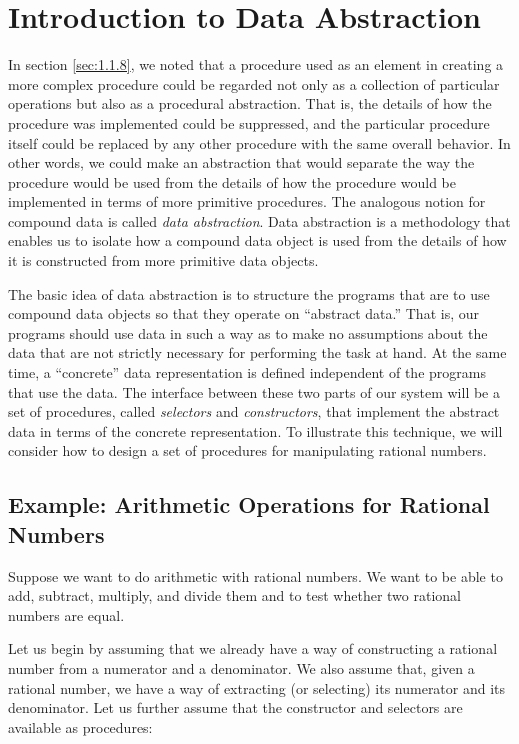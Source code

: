 

\section{Introduction to Data Abstraction}
\label{sec:2.1}

In section \ref{sec:1.1.8}, we noted
that a procedure used as an element in creating a more complex
procedure could be regarded not only as a collection of particular
operations but also as a procedural abstraction.  That is, the details
of how the procedure was implemented could be suppressed, and the
particular procedure itself could be replaced by any other procedure
with the same overall behavior.  In other words, we could make an
abstraction that would separate the way the procedure would be used
from the details of how the procedure would be implemented in terms of
more primitive procedures.  The analogous notion for compound data is
called \textit{data abstraction}.  Data abstraction is a methodology that
enables us to isolate how a compound data object is used from the
details of how it is constructed from more primitive data objects.

The basic idea of data abstraction is to structure the programs that
are to use compound data objects so that they operate on ``abstract
data.'' That is, our programs should use data in such a way as to make
no assumptions about the data that are not strictly necessary for
performing the task at hand.  At the same time, a ``concrete'' data
representation is defined independent of the programs that use
the data.  The interface between these two parts of our system will be
a set of procedures, called \textit{selectors} and \textit{constructors},
that implement the abstract data in terms of the concrete
representation.  To illustrate this technique, we will consider how to
design a set of procedures for manipulating rational numbers.


\subsection{Example: Arithmetic Operations for Rational Numbers}
\label{sec:2.1.1}



Suppose we want to do arithmetic with rational numbers.  We want to be
able to add, subtract, multiply, and divide them and to test whether
two rational numbers are equal.

Let us begin by assuming that we already have a way of constructing a
rational number from a numerator and a denominator.  We also assume
that, given a rational number, we have a way of extracting (or
selecting) its numerator and its denominator.  Let us further assume
that the constructor and selectors are available as procedures:

